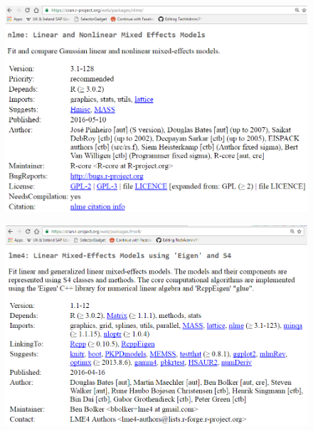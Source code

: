 \documentclass[Master.tex]{subfiles}
\begin{document}
\begin{frame}
	\begin{figure}
		\centering
		\includegraphics[width=0.97\linewidth]{images/nlmeCRAN}
	\end{figure}
\end{frame}
\begin{frame}
	\begin{figure}
\centering
\includegraphics[width=0.97\linewidth]{images/lme4CRAN}

\end{figure}
\end{frame}
\end{document}
